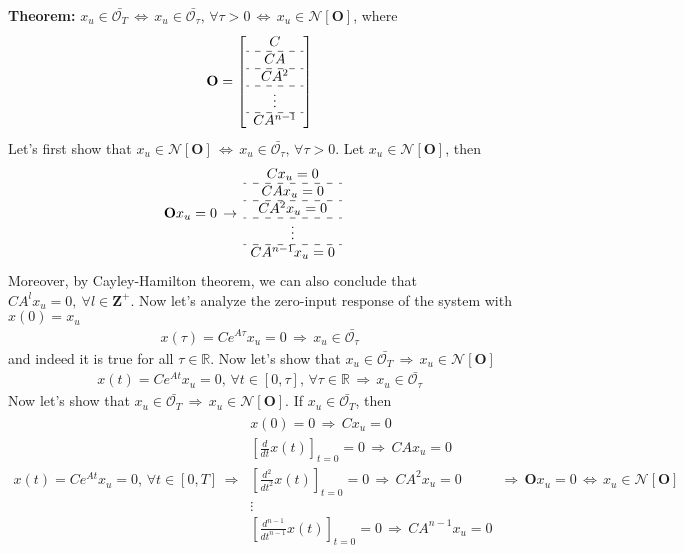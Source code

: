 \documentclass[twoside]{article}
\begin{document}
\textbf{Theorem:} $x_u \in \bar{\mathcal{O}_T} \, \iff \, 
x_u \in \bar{\mathcal{O}_{\tau}} , \, \forall \tau > 0 \, \iff \, 
x_u \in \mathcal{N}[ \mathbf{O} ]$, where 
%
\begin{align*}
  \mathbf{O} = \left[ 
  \begin{array}{c}
    C 
    \\ \hdashline
    C A 
    \\ \hdashline
    C A^2
    \\ \hdashline
    \vdots
    \\ \hdashline
    C A^{n-1}
  \end{array}
  \right]
\end{align*}
%
Let's first show that $x_u \in \mathcal{N}[ \mathbf{O} ] \, \iff \, x_u \in \bar{\mathcal{O}_{\tau}} , \, \forall \tau > 0$. Let $x_u \in \mathcal{N}[ \mathbf{O} ]$, then  
%
\begin{align*}
  \mathbf{O} x_u &= 0
  \, 
    \rightarrow
  \,
  \begin{array}{c}
    C x_u = 0
    \\ \hdashline
    C A x_u = 0
    \\ \hdashline
    C A^2 x_u = 0
    \\ \hdashline
    \vdots
    \\ \hdashline
    C A^{n-1} x_u = 0
  \end{array}
\end{align*}
%
Moreover, by Cayley-Hamilton theorem, we can also conclude that $C A^{l} x_u = 0, \ \forall l \in \mathbf{Z}^+$. Now let's analyze the zero-input response of the system with $x(0) = x_u$
%
\begin{align*}
  x(\tau) = C e^{A \tau} x_u = 0 \, \Rightarrow \, x_u \in \bar{\mathcal{O}_{\tau}}
\end{align*}
%
and indeed it is true for all $\tau \in \mathbb{R}$. Now let's 
show that $x_u \in \bar{\mathcal{O}_T} \, \Rightarrow \, x_u \in \mathcal{N}[ \mathbf{O} ]$
%
\begin{align*}
  x(t) = C e^{A t} x_u = 0 , \, 
  \forall t \in [0,\tau] , \, \forall 
  \tau \in \mathbb{R} \, \Rightarrow \, x_u \in \bar{\mathcal{O}_{\tau}}
\end{align*}
%
Now let's show that $x_u \in \bar{\mathcal{O}_T} \, \Rightarrow \, 
x_u \in \mathcal{N}[ \mathbf{O} ]$. If $x_u \in \bar{\mathcal{O}_T}$, then 
%
\begin{align*}
  x(t) = C e^{A t} x_u = 0 , \, \forall t \in [0,T] \, 
  \Rightarrow \, \begin{array}{c} 
  x(0) = 0 \, \Rightarrow \, C x_u = 0
  \\
  \left[\frac{d}{dt}x(t) \right]_{t=0} = 0 \, \Rightarrow \, C A x_u = 0
  \\
  \left[\frac{d^2}{dt^2}x(t) \right]_{t=0} = 0 \, \Rightarrow \, C A^2 x_u = 0
  \\
  \vdots
  \\
  \left[\frac{d^{n-1}}{dt^{n-1}}x(t) \right]_{t=0} = 0 \, \Rightarrow \, C A^{n-1} x_u = 0
  \end{array}
  \, \Rightarrow \, \mathbf{O} x_u = 0 
  \, \iff \, x_u \in \mathcal{N}[ \mathbf{O} ]
\end{align*}
\end{document}
